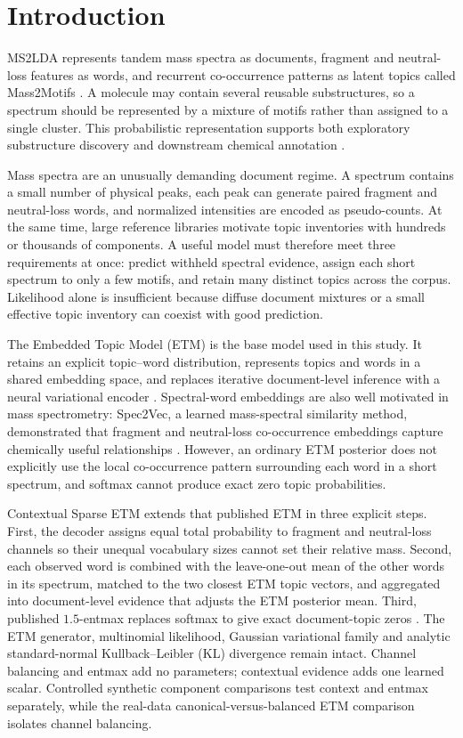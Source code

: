 \documentclass[10pt,a4paper]{article}
\begin{document}
\section{Introduction}

MS2LDA represents tandem mass spectra as documents, fragment and neutral-loss
features as words, and recurrent co-occurrence patterns as latent topics called
Mass2Motifs \cite{vanderhooft2016}. A molecule may contain several reusable
substructures, so a spectrum should be represented by a mixture of motifs rather
than assigned to a single cluster. This probabilistic representation supports
both exploratory substructure discovery and downstream chemical annotation
\cite{torresortega2026}.

Mass spectra are an unusually demanding document regime. A spectrum contains a
small number of physical peaks, each peak can generate paired fragment and
neutral-loss words, and normalized intensities are encoded as pseudo-counts.
At the same time, large reference libraries motivate topic inventories with
hundreds or thousands of components. A useful model must therefore meet three
requirements at once: predict withheld spectral evidence, assign each short
spectrum to only a few motifs, and retain many distinct topics across the
corpus. Likelihood alone is insufficient because diffuse document mixtures or a
small effective topic inventory can coexist with good prediction.

The Embedded Topic Model (ETM) is the base model used in this study. It
retains an explicit topic--word distribution, represents topics and words in a
shared embedding space, and replaces iterative document-level inference with a
neural variational encoder \cite{dieng2020}. Spectral-word embeddings are also
well motivated in mass spectrometry: Spec2Vec, a learned mass-spectral
similarity method, demonstrated that fragment and neutral-loss co-occurrence
embeddings capture chemically useful relationships \cite{huber2021}. However,
an ordinary ETM posterior does not explicitly use
the local co-occurrence pattern surrounding each word in a short spectrum, and
softmax cannot produce exact zero topic probabilities.

Contextual Sparse ETM extends that published ETM in three explicit steps. First,
the decoder assigns equal total probability to fragment and neutral-loss
channels so their unequal vocabulary sizes cannot set their relative mass.
Second, each observed word is combined with the leave-one-out mean of the other
words in its spectrum, matched to the two closest ETM topic vectors, and
aggregated into document-level evidence that adjusts the ETM posterior mean.
Third, published $1.5$-entmax replaces softmax to give exact document-topic
zeros \cite{peters2019}. The ETM generator, multinomial likelihood, Gaussian
variational family and analytic standard-normal Kullback--Leibler (KL)
divergence remain intact. Channel
balancing and entmax add no parameters; contextual evidence adds one learned
scalar. Controlled synthetic component comparisons test context and entmax
separately, while the real-data canonical-versus-balanced ETM comparison
isolates channel balancing.
\end{document}
